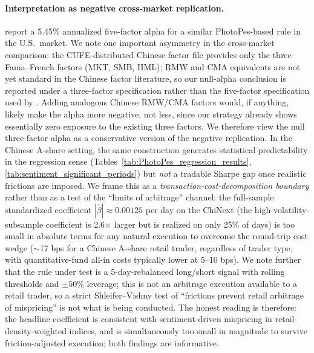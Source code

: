 \documentclass[AER]{AEA}
\begin{document}
\paragraph{Interpretation as negative cross-market replication.} \citet{obaid2022picture} report a 5.45\% annualized five-factor alpha for a similar PhotoPes-based rule in the U.S.\ market. We note one important asymmetry in the cross-market comparison: the CUFE-distributed Chinese factor file provides only the three Fama--French factors (MKT, SMB, HML); RMW and CMA equivalents are not yet standard in the Chinese factor literature, so our null-alpha conclusion is reported under a three-factor specification rather than the five-factor specification used by \citet{obaid2022picture}. Adding analogous Chinese RMW/CMA factors would, if anything, likely make the alpha more negative, not less, since our strategy already shows essentially zero exposure to the existing three factors. We therefore view the null three-factor alpha as a conservative version of the negative replication. In the Chinese A-share setting, the same construction generates statistical predictability in the regression sense (Tables~\ref{tab:PhotoPes_regression_results}, \ref{tab:sentiment_significant_periods}) but \emph{not} a tradable Sharpe gap once realistic frictions are imposed. We frame this as a \emph{transaction-cost-decomposition boundary} rather than as a test of the \citet{shleifer1997limits} ``limits of arbitrage'' channel: the full-sample standardized coefficient $|\hat\beta| \approx 0.00125$ per day on the ChiNext (the high-volatility-subsample coefficient is 2.6$\times$ larger but is realized on only 25\% of days) is too small in absolute terms for any natural execution to overcome the round-trip cost wedge ($\sim$17 bps for a Chinese A-share retail trader, regardless of trader type, with quantitative-fund all-in costs typically lower at 5--10 bps). We note further that the rule under test is a 5-day-rebalanced long/short signal with rolling thresholds and $\pm 50\%$ leverage; this is not an arbitrage execution available to a retail trader, so a strict Shleifer--Vishny test of ``frictions prevent retail arbitrage of mispricing'' is not what is being conducted. The honest reading is therefore: the headline coefficient is consistent with sentiment-driven mispricing in retail-density-weighted indices, and is simultaneously too small in magnitude to survive friction-adjusted execution; both findings are informative.
\end{document}
